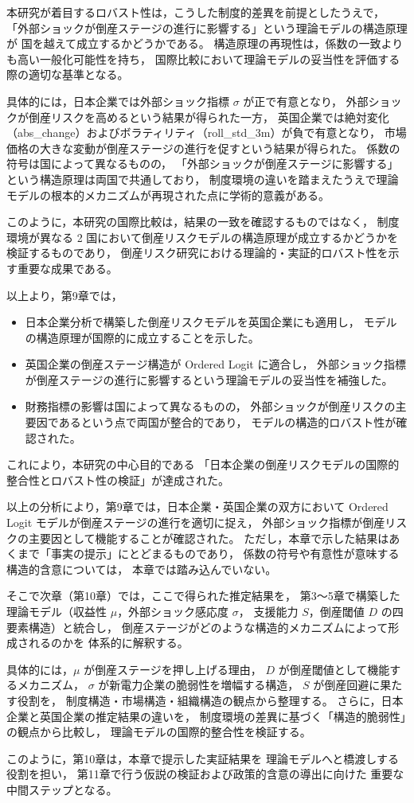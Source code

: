 本研究が着目するロバスト性は，こうした制度的差異を前提としたうえで，
「外部ショックが倒産ステージの進行に影響する」という理論モデルの構造原理が
国を越えて成立するかどうかである。
構造原理の再現性は，係数の一致よりも高い一般化可能性を持ち，
国際比較において理論モデルの妥当性を評価する際の適切な基準となる。

具体的には，日本企業では外部ショック指標 $\sigma$ が正で有意となり，
外部ショックが倒産リスクを高めるという結果が得られた一方，
英国企業では絶対変化（abs\_change）およびボラティリティ（roll\_std\_3m）が負で有意となり，
市場価格の大きな変動が倒産ステージの進行を促すという結果が得られた。
係数の符号は国によって異なるものの，
「外部ショックが倒産ステージに影響する」という構造原理は両国で共通しており，
制度環境の違いを踏まえたうえで理論モデルの根本的メカニズムが再現された点に学術的意義がある。

このように，本研究の国際比較は，結果の一致を確認するものではなく，
制度環境が異なる 2 国において倒産リスクモデルの構造原理が成立するかどうかを検証するものであり，
倒産リスク研究における理論的・実証的ロバスト性を示す重要な成果である。

以上より，第9章では，
\begin{itemize}
    \item 日本企業分析で構築した倒産リスクモデルを英国企業にも適用し，
          モデルの構造原理が国際的に成立することを示した。
    \item 英国企業の倒産ステージ構造が Ordered Logit に適合し，
          外部ショック指標が倒産ステージの進行に影響するという理論モデルの妥当性を補強した。
    \item 財務指標の影響は国によって異なるものの，
          外部ショックが倒産リスクの主要因であるという点で両国が整合的であり，
          モデルの構造的ロバスト性が確認された。
\end{itemize}

これにより，本研究の中心目的である
「日本企業の倒産リスクモデルの国際的整合性とロバスト性の検証」が達成された。

以上の分析により，第9章では，日本企業・英国企業の双方において
Ordered Logit モデルが倒産ステージの進行を適切に捉え，
外部ショック指標が倒産リスクの主要因として機能することが確認された。
ただし，本章で示した結果はあくまで「事実の提示」にとどまるものであり，
係数の符号や有意性が意味する構造的含意については，
本章では踏み込んでいない。

そこで次章（第10章）では，ここで得られた推定結果を，
第3〜5章で構築した理論モデル（収益性 $\mu$，外部ショック感応度 $\sigma$，
支援能力 $S$，倒産閾値 $D$ の四要素構造）と統合し，
倒産ステージがどのような構造的メカニズムによって形成されるのかを
体系的に解釈する。

具体的には，$\mu$ が倒産ステージを押し上げる理由，
$D$ が倒産閾値として機能するメカニズム，
$\sigma$ が新電力企業の脆弱性を増幅する構造，
$S$ が倒産回避に果たす役割を，
制度構造・市場構造・組織構造の観点から整理する。
さらに，日本企業と英国企業の推定結果の違いを，
制度環境の差異に基づく「構造的脆弱性」の観点から比較し，
理論モデルの国際的整合性を検証する。

このように，第10章は，本章で提示した実証結果を
理論モデルへと橋渡しする役割を担い，
第11章で行う仮説の検証および政策的含意の導出に向けた
重要な中間ステップとなる。
